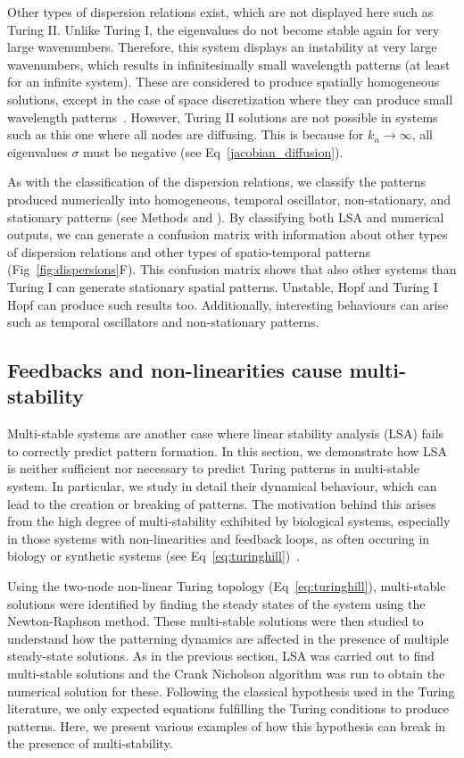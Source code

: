 \documentclass[10pt,letterpaper]{article}
\begin{document}
Other types of dispersion relations exist, which are not displayed here such as Turing II. Unlike Turing I, the eigenvalues do not become stable again for very large wavenumbers.
Therefore, this system displays an instability at very large wavenumbers, which results in infinitesimally small wavelength patterns (at least for an infinite system). These are considered to produce spatially homogeneous solutions, except in the case of space discretization where they can produce small wavelength patterns~\parencite{Wang2022}.
However, Turing II solutions are not possible in systems such as this one where all nodes are diffusing.
This is because for $k_n \rightarrow \infty$, all eigenvalues $\sigma$ must be negative (see Eq~\ref{jacobian_diffusion}).

As with the classification of the dispersion relations, we classify the patterns produced numerically into homogeneous, temporal oscillator, non-stationary, and stationary patterns (see Methods and ).
By classifying both LSA and numerical outputs, we can generate a confusion matrix with information about other types of dispersion relations and other types of spatio-temporal patterns (Fig~\ref{fig:dispersions}F). This confusion matrix shows that also other systems than Turing I can generate stationary spatial patterns. Unstable, Hopf and Turing I Hopf can produce such results too. Additionally, interesting behaviours can arise such as temporal oscillators and non-stationary patterns.


\subsection*{Feedbacks and non-linearities cause multi-stability}

Multi-stable systems are another case where linear stability analysis (LSA) fails to correctly predict pattern formation.  In this section, we demonstrate how LSA is neither sufficient 
nor necessary to predict Turing patterns in multi-stable system. In particular, we study in detail their dynamical behaviour, which can lead to the creation or breaking of patterns.
The motivation behind this arises from the high degree of multi-stability exhibited by biological systems, especially in those systems with non-linearities and feedback loops, as often occuring in biology or synthetic systems (see Eq~\ref{eq:turinghill})~\parencite{pham2020complexity, leite2009multistability}.

Using the two-node non-linear Turing topology (Eq~\ref{eq:turinghill}), multi-stable solutions were identified by finding the steady states of the system using the Newton-Raphson method. These multi-stable solutions were then studied to understand how the patterning dynamics are affected in the presence of multiple steady-state solutions.
As in the previous section, LSA was carried out to find multi-stable solutions and the Crank Nicholson algorithm was run to obtain the numerical solution for these.
Following the classical hypothesis used in the Turing literature, we only expected equations fulfilling the Turing conditions to produce patterns.
Here, we present various examples of how this hypothesis can break in the presence of multi-stability.
\end{document}
